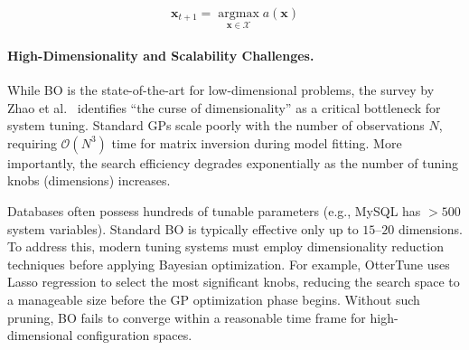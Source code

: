 \[\mathbf{x}_{t+1} = \operatorname*{argmax}_{\mathbf{x} \in \mathcal{X}} a(\mathbf{x})\]

\paragraph{High-Dimensionality and Scalability Challenges.}
While BO is the state-of-the-art for low-dimensional problems, the survey by Zhao et al.~\cite{autotune_survey} identifies ``the curse of dimensionality'' as a critical bottleneck for system tuning.
Standard GPs scale poorly with the number of observations $N$, requiring $\mathcal{O}(N^3)$ time for matrix inversion during model fitting.
More importantly, the search efficiency degrades exponentially as the number of tuning knobs (dimensions) increases.

Databases often possess hundreds of tunable parameters (e.g., MySQL has $>500$ system variables).
Standard BO is typically effective only up to $15$--$20$ dimensions.
To address this, modern tuning systems must employ dimensionality reduction techniques before applying Bayesian optimization.
For example, OtterTune uses Lasso regression to select the most significant knobs, reducing the search space to a manageable size before the GP optimization phase begins.
Without such pruning, BO fails to converge within a reasonable time frame for high-dimensional configuration spaces.

